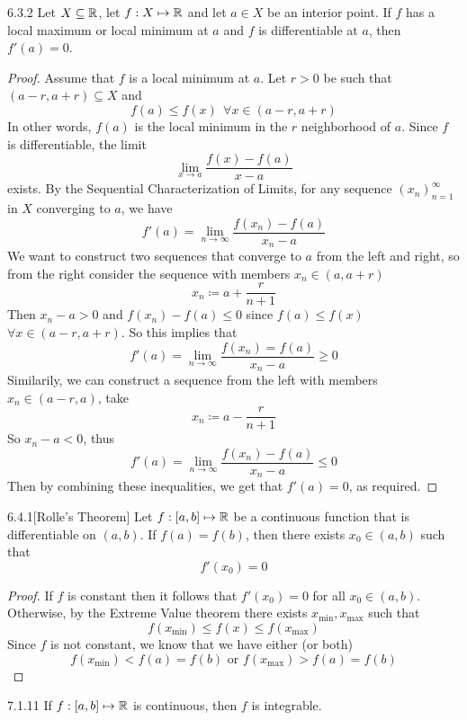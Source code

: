 \documentclass[openany]{report}
\begin{document}
\begin{manualtheorem}{6.3.2}
    Let $X \subseteq \mathbb{R}$, let $f: X \mapsto \mathbb{R}$ and let $a \in X$ be an interior point. If $f$ has a local maximum or local minimum at $a$ and $f$ is differentiable at $a$, then $f'(a) = 0$.
\end{manualtheorem}
\begin{proof}
    Assume that $f$ is a local minimum at $a$. Let $r > 0$ be such that $(a-r, a+r) \subseteq X$ and 
    \[f(a) \leq f(x) \ \ \forall x \in (a - r, a + r)\]
    In other words, $f(a)$ is the local minimum in the $r$ neighborhood of $a$. Since $f$ is differentiable, the limit 
    \[\lim_{x\rightarrow a} \frac{f(x) - f(a)}{x-a}\]
    exists. By the Sequential Characterization of Limits, for any sequence $(x_n)_{n=1}^\infty$ in $X$ converging to $a$, we have 
    \[f'(a) = \lim_{n\rightarrow\infty} \frac{f(x_n) - f(a)}{x_n - a}\]
    We want to construct two sequences that converge to $a$ from the left and right, so from the right consider the sequence with members $x_n \in (a, a+r)$
    \[x_n \coloneqq a + \frac{r}{n+1}\]
    Then $x_n - a > 0$ and $f(x_n) - f(a) \leq 0$ since $f(a) \leq f(x)$ $\forall x \in (a - r, a + r)$. So this implies that 
    \[f'(a) = \lim_{n\rightarrow \infty} \frac{f(x_n) = f(a)}{x_n-a} \geq 0\]
    Similarily, we can construct a sequence from the left with members $x_n \in (a-r, a)$, take 
    \[x_n \coloneqq a - \frac{r}{n+1}\]
    So $x_n - a < 0$, thus
    \[f'(a) = \lim_{n \rightarrow \infty} \frac{f(x_n)-f(a)}{x_n-a} \leq 0\]
    Then by combining these inequalities, we get that $f'(a) = 0$, as required.
\end{proof}

\begin{manualtheorem}{6.4.1}[Rolle's Theorem]
    Let $f: [a,b] \mapsto \mathbb{R}$ be a continuous function that is differentiable on $(a,b)$. If $f(a) = f(b)$, then there exists $x_0 \in (a,b)$ such that
    \[f'(x_0) = 0\]
\end{manualtheorem}
\begin{proof}
    If $f$ is constant then it follows that $f'(x_0) = 0$ for all $x_0 \in (a,b)$. Otherwise, by the Extreme Value theorem there exists $x_{\min}, x_{\max}$ such that 
    \[f(x_{\min}) \leq f(x) \leq f(x_{\max})\]
    Since $f$ is not constant, we know that we have either (or both)
    \[f(x_{\min}) < f(a) = f(b) \text{ or } f(x_{\max}) > f(a) = f(b)\]
\end{proof}

\begin{manualtheorem}{7.1.11}
    If $f: [a,b] \mapsto \mathbb{R}$ is continuous, then $f$ is integrable. 
\end{manualtheorem}
\end{document}
